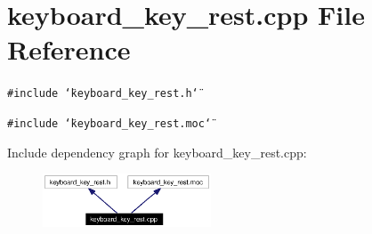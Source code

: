 \section{keyboard\_\-key\_\-rest.cpp File Reference}
\label{keyboard__key__rest_8cpp}


{\tt \#include \char`\"{}keyboard\_\-key\_\-rest.h\char`\"{}}\par
{\tt \#include \char`\"{}keyboard\_\-key\_\-rest.moc\char`\"{}}\par


Include dependency graph for keyboard\_\-key\_\-rest.cpp:\begin{figure}[H]
\begin{center}
\leavevmode
\includegraphics[width=142pt]{keyboard__key__rest_8cpp__incl}
\end{center}
\end{figure}
